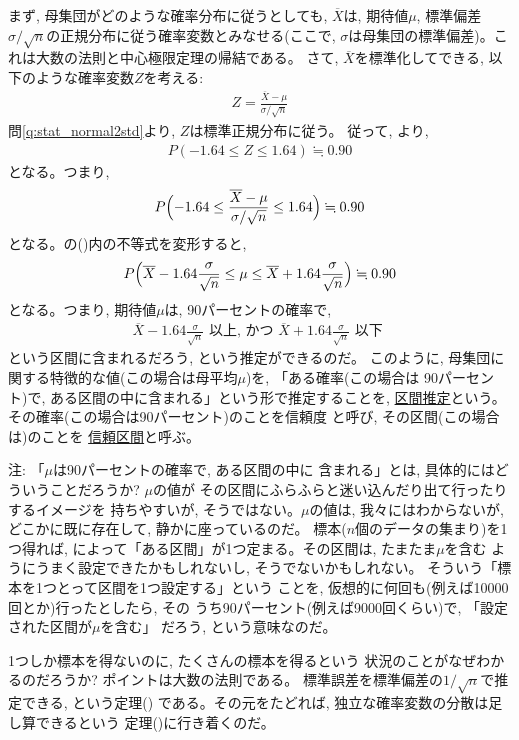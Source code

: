 まず, 母集団がどのような確率分布に従うとしても, $\overline{X}$は, 期待値$\mu$, 
標準偏差$\sigma/\sqrt{n}$の正規分布に従う確率変数とみなせる(ここで, 
$\sigma$は母集団の標準偏差)。これは大数の法則と中心極限定理の帰結である。
さて, $\overline{X}$を標準化してできる, 以下のような確率変数$Z$を考える:
\begin{eqnarray}
Z=\frac{\overline{X}-\mu}{\sigma/\sqrt{n}}\label{eq:kukansuitei01}
\end{eqnarray}
問\ref{q:stat_normal2std}より, $Z$は標準正規分布に従う。
従って, より, 
\begin{eqnarray}
P(-1.64\leq Z\leq 1.64)\fallingdotseq0.90\label{eq:kukansuitei03}
\end{eqnarray}
となる。つまり, 
\begin{eqnarray}
P\Bigl(-1.64\leq\frac{\overline{X}-\mu}{\sigma/\sqrt{n}}\leq1.64\Bigr)\fallingdotseq0.90\label{eq:kukansuitei05}
\end{eqnarray}
となる。の()内の不等式を変形すると, 
\begin{eqnarray}
P\Bigl(\overline{X}-1.64\frac{\sigma}{\sqrt{n}}\leq\mu\leq\overline{X}+1.64\frac{\sigma}{\sqrt{n}}\Bigr)\fallingdotseq0.90\nonumber\\\label{eq:kukansuitei07}
\end{eqnarray}
となる。つまり, 期待値$\mu$は, 90パーセントの確率で, 
\begin{eqnarray}
\overline{X}-1.64\frac{\sigma}{\sqrt{n}}\text{ 以上, かつ }\overline{X}+1.64\frac{\sigma}{\sqrt{n}}\text{ 以下  }\label{eq:stat_shinraikukan90}
\end{eqnarray}
という区間に含まれるだろう, という推定ができるのだ。
このように, 母集団に関する特徴的な値(この場合は母平均$\mu$)を, 「ある確率(この場合は
90パーセント)で, ある区間の中に含まれる」という形で推定することを, 
\underline{区間推定}という。
その確率(この場合は90パーセント)のことを信頼度
と呼び, その区間(この場合は)のことを
\underline{信頼区間}と呼ぶ。\\

{\small 注: 「$\mu$は90パーセントの確率で, ある区間の中に
含まれる」とは, 具体的にはどういうことだろうか? $\mu$の値が
その区間にふらふらと迷い込んだり出て行ったりするイメージを
持ちやすいが, そうではない。$\mu$の値は, 我々にはわからないが, 
どこかに既に存在して, 静かに座っているのだ。
標本($n$個のデータの集まり)を1つ得れば, 
によって「ある区間」が1つ定まる。その区間は, たまたま$\mu$を含む
ようにうまく設定できたかもしれないし, そうでないかもしれない。
そういう「標本を1つとって区間を1つ設定する」という
ことを, 仮想的に何回も(例えば10000回とか)行ったとしたら, その
うち90パーセント(例えば9000回くらい)で, 「設定された区間が$\mu$を含む」
だろう, という意味なのだ。

1つしか標本を得ないのに, たくさんの標本を得るという
状況のことがなぜわかるのだろうか? ポイントは大数の法則である。
標準誤差を標準偏差の$1/\sqrt{n}$で推定できる, 
という定理()
である。その元をたどれば, 独立な確率変数の分散は足し算できるという
定理()に行き着くのだ。\\}

